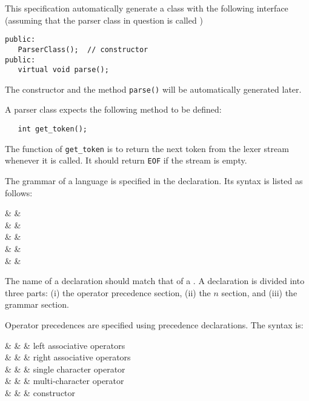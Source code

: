 This specification automatically generate a class with the following interface
(assuming that the parser class in question is called )
\begin{verbatim}
public:  
   ParserClass();  // constructor
public:
   virtual void parse();
\end{verbatim}

The constructor and the method \verb|parse()| will be automatically
generated later. 

A parser class expects the following method to be defined:
\begin{verbatim}
   int get_token();
\end{verbatim}
\noindent The function of \verb|get_token| is to return the
next token from the lexer stream whenever it is called.
It should return \verb|EOF| if the stream is empty.


The grammar of a language is specified in the  declaration.
Its syntax is listed as follows:

\begin{syntax}
 & \IS &  \Id \T{\{} \\
    & & \quad {} \\
    & & \quad {} \\
    & & \quad {} \\
    & & \T{\}} \\
\end{syntax}

The name of a  declaration should match that
of a  .  A  declaration is divided
into three parts: (i) the operator precedence section, (ii) the
 $n$ section, and (iii) the grammar section.


Operator precedences are specified using precedence declarations.
The syntax is: 

\begin{syntax}
    & \IS &    \T{;} 
          & left associative operators \\
    & \OR &    \T{;} 
    & right associative operators \\
 & \IS &    & single character operator \\
             & \OR &  & multi-character operator \\
             & \OR &    & constructor \\
\end{syntax}

